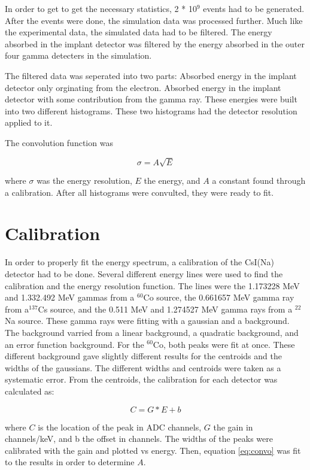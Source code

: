 In order to get to get the necessary statistics, 2 * 10$^{9}$ events had to be generated. 
After the events were done, the simulation data was processed further. 
Much like the experimental data, the simulated data had to be filtered.
The energy absorbed in the implant detector was filtered by the energy absorbed in the outer four gamma detecters in the simulation.

The filtered data was seperated into two parts:
Absorbed energy in the implant detector only orginating from the electron.
Absorbed energy in the implant detector with some contribution from the gamma ray.
These energies were built into two different histograms.
These two histograms had the detector resolution applied to it. 

The convolution function was

\begin{equation}
	\sigma = A\sqrt{E}
	\label{eq:convo}
\end{equation}

where $\sigma$ was the energy resolution, $E$ the energy, and $A$ a constant found through a calibration.
After all histograms were convulted, they were ready to fit.

\section{Calibration}
In order to properly fit the energy spectrum, a calibration of the CsI(Na) detector had to be done.
Several different energy lines were used to find the calibration and the energy resolution function.
The lines were the 1.173228 MeV and 1.332.492 MeV gammas from a $^{60}$Co source, the 0.661657 MeV gamma ray from a$^{137}$Cs source, and the 0.511 MeV and 1.274527 MeV gamma rays from a $^{22}$Na source.
These gamma rays were fitting with a gaussian and a background.
The background varried from a linear background, a quadratic background, and an error function background.
For the $^{60}$Co, both peaks were fit at once.
These different background gave slightly different results for the centroids and the widths of the gaussians.
The different widths and centroids were taken as a systematic error.
From the centroids, the calibration for each detector was calculated as:

\begin{equation}
	C = G * E + b
	\label{eq:convo}
\end{equation}

where $C$ is the location of the peak in ADC channels, $G$ the gain in channels/keV, and b the offset in channels.
The widths of the peaks were calibrated with the gain and plotted vs energy.
Then, equation \ref{eq:convo} was fit to the results in order to determine $A$.

